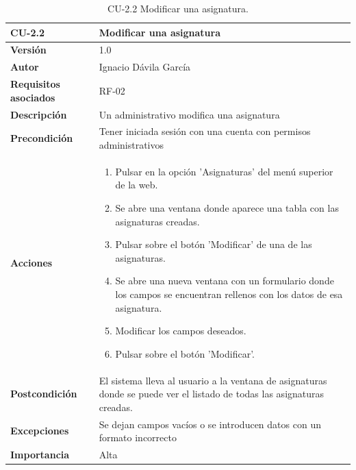 \begin{table}[p]
	\centering
	\begin{tabularx}{\linewidth}{ p{} p{} }
		\toprule
		\textbf{CU-2.2}    & \textbf{Modificar una asignatura}\\
		\toprule
		\textbf{Versión}              & 1.0    \\
		\textbf{Autor}                & Ignacio Dávila García \\
		\textbf{Requisitos asociados} & RF-02 \\
		\textbf{Descripción}          & Un administrativo modifica una asignatura \\
		\textbf{Precondición}         & Tener iniciada sesión con una cuenta con permisos administrativos \\
		\textbf{Acciones}             &
		\begin{enumerate}
			\def\labelenumi{\arabic{enumi}.}
			\tightlist
			\item Pulsar en la opción 'Asignaturas' del menú superior de la web.
			\item Se abre una ventana donde aparece una tabla con las asignaturas creadas.
			\item Pulsar sobre el botón 'Modificar' de una de las asignaturas.
			\item Se abre una nueva ventana con un formulario donde los campos se encuentran rellenos con los datos de esa asignatura.
			\item Modificar los campos deseados.
			\item Pulsar sobre el botón 'Modificar'.
		\end{enumerate}\\
		\textbf{Postcondición}        & El sistema lleva al usuario a la ventana de asignaturas donde se puede ver el listado de todas las asignaturas creadas. \\
		\textbf{Excepciones}          & Se dejan campos vacíos o se introducen datos con un formato incorrecto \\
		\textbf{Importancia}          & Alta \\
		\bottomrule
	\end{tabularx}
	\caption{CU-2.2 Modificar una asignatura.}
\end{table}

